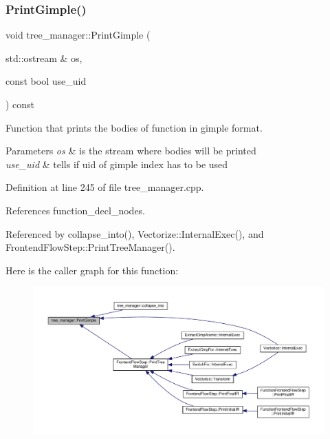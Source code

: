 \subsubsection{\texorpdfstring{Print\+Gimple()}{PrintGimple()}}
{\footnotesize\ttfamily void tree\+\_\+manager\+::\+Print\+Gimple (\begin{DoxyParamCaption}\item[{std\+::ostream \&}]{os,  }\item[{const bool}]{use\+\_\+uid }\end{DoxyParamCaption}) const}



Function that prints the bodies of function in gimple format. 


\begin{DoxyParams}{Parameters}
{\em os} & is the stream where bodies will be printed \\
\hline
{\em use\+\_\+uid} & tells if uid of gimple index has to be used \\
\hline
\end{DoxyParams}


Definition at line 245 of file tree\+\_\+manager.\+cpp.



References function\+\_\+decl\+\_\+nodes.



Referenced by collapse\+\_\+into(), Vectorize\+::\+Internal\+Exec(), and Frontend\+Flow\+Step\+::\+Print\+Tree\+Manager().

Here is the caller graph for this function\+:
\nopagebreak
\begin{figure}[H]
\begin{center}
\leavevmode
\includegraphics[width=350pt]{d2/ddd/classtree__manager_a580b0289adae5c5d180ceae72ea854fc_icgraph}
\end{center}
\end{figure}
\mbox{\label{classtree__manager_a667fbe393ae2af64dab9240f92134c5b}} 
